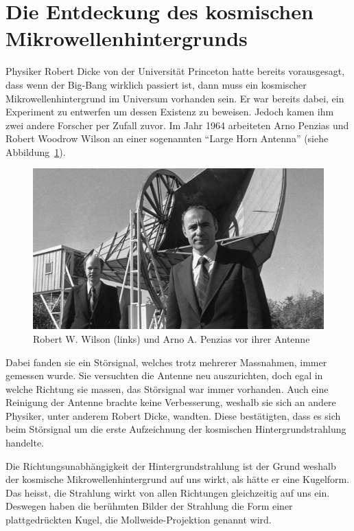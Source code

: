 \section{Die Entdeckung des kosmischen Mikrowellenhintergrunds}
Physiker Robert Dicke von der Universität Princeton hatte bereits vorausgesagt, dass wenn der Big-Bang wirklich passiert ist, dann muss ein kosmischer Mikrowellenhintergrund im Universum vorhanden sein. Er war bereits dabei, ein Experiment zu entwerfen um dessen Existenz zu beweisen. Jedoch kamen ihm zwei andere Forscher per Zufall zuvor.
Im Jahr 1964 arbeiteten Arno Penzias und Robert Woodrow Wilson an einer 
sogenannten ``Large Horn Antenna'' (siehe Abbildung~\ref{fig:wilson_penzias}).
\begin{figure}
	\centering
	\includegraphics[width=\linewidth]{cmb/images/penzias-wilson-large-horn-antenna.jpg}
	\caption{Robert W. Wilson (links) und Arno A. Penzias vor ihrer Antenne}
	\label{fig:wilson_penzias}
\end{figure}
Dabei fanden sie ein Störsignal, welches trotz mehrerer Massnahmen, immer gemessen wurde.
Sie versuchten die Antenne neu auszurichten, doch egal in welche Richtung sie massen,
das Störsignal war immer vorhanden.
Auch eine Reinigung der Antenne brachte keine Verbesserung, weshalb sie sich an 
andere Physiker, unter anderem Robert Dicke, wandten. Diese bestätigten, dass 
es sich beim Störsignal um die erste Aufzeichnung der kosmischen 
Hintergrundstrahlung handelte.

Die Richtungsunabhängigkeit der Hintergrundstrahlung ist der Grund weshalb der 
kosmische Mikrowellenhintergrund auf uns wirkt, als hätte er eine Kugelform. 
Das heisst, die Strahlung wirkt von allen Richtungen gleichzeitig auf uns ein.
Deswegen haben die berühmten Bilder der Strahlung die Form einer 
plattgedrückten Kugel, die Mollweide-Projektion genannt wird.

